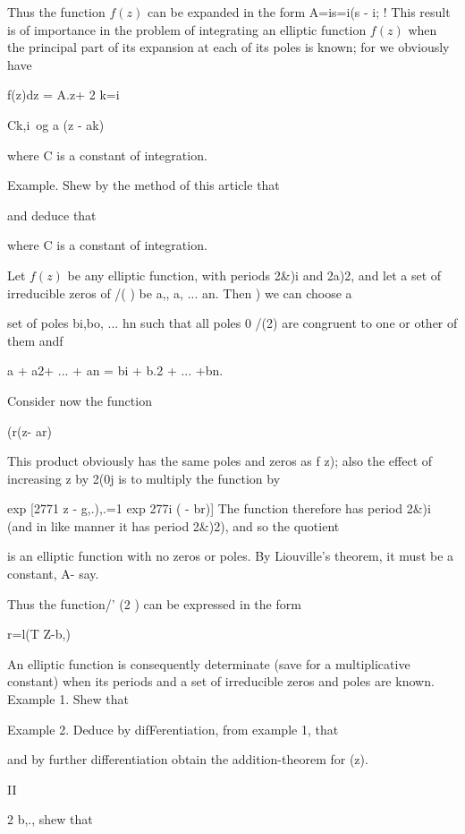 {Thus the function $f(z)$ can be expanded in the form
A=is=i(s - i; ! 
This result is of importance in the problem of
integrating an elliptic function $f(z)$ when the principal part of its
expansion at each of its poles is known; for we obviously have

f(z)dz = A.z+ 2 k=i

Ck,i\ og a (z - ak)

where C is a constant of integration.

Example. Shew by the method of this article that

and deduce that

where C is a constant of integration.


Let $f(z)$ be any elliptic function, with periods 2\&)i and 2a)2, and
let a set of irreducible zeros of /( ) be a,, a, ... an. Then
) we can choose a

%
%

set of poles bi,bo, ... hn such that all poles 0 /(2) are congruent to
one or other of them andf

a + a2+ ... + an = bi + b.2 + ... +bn.

Consider now the function

  (r(z- ar)

This product obviously has the same poles and zeros as f z); also the
effect of increasing z by 2(0j is to multiply the function by

  exp [2771 z - g,.),.=1 exp 277i ( - br)] The function therefore has
period 2\&)i (and in like manner it has period 2\&)2), and so the
quotient

is an elliptic function with no zeros or poles. By Liouville's
theorem, it must be a constant, A- say.

Thus the function/' (2 ) can be expressed in the form

r=l(T Z-b,)

An elliptic function is consequently determinate (save for a
multiplicative constant) when its periods and a set of irreducible
zeros and poles are known. Example 1. Shew that

Example 2. Deduce by difFerentiation, from example 1, that

and by further differentiation obtain the addition-theorem for (z).

II

2 b,., shew that

}
